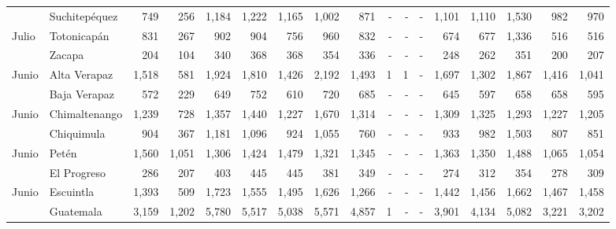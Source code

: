 \begin{landscape}
\begin{center}
\begin{longtable}{llrrrrrrrrrrrrrrr}
			\rowcolor{color1!5!white}\multicolumn{1}{l}{	\footnotesize	 Julio 	}&	 Suchitepéquez 	&	 749 	&	 256 	&	 1,184 	&	 1,222 	&	 1,165 	&	 1,002 	&	 871 	&	 -   	&	 -   	&	 -   	&	 1,101 	&	 1,110 	&	 1,530 	&	 982 	&	 970 	\\
			\multicolumn{1}{l}{	\footnotesize	 Julio 	}&	 Totonicapán 	&	 831 	&	 267 	&	 902 	&	 904 	&	 756 	&	 960 	&	 832 	&	 -   	&	 -   	&	 -   	&	 674 	&	 677 	&	 1,336 	&	 516 	&	 516 	\\
			\rowcolor{color1!5!white}\multicolumn{1}{l}{	\footnotesize	 Julio 	}&	 Zacapa 	&	 204 	&	 104 	&	 340 	&	 368 	&	 368 	&	 354 	&	 336 	&	 -   	&	 -   	&	 -   	&	 248 	&	 262 	&	 351 	&	 200 	&	 207 	\\
			\multicolumn{1}{l}{	\footnotesize	 Junio 	}&	 Alta Verapaz 	&	 1,518 	&	 581 	&	 1,924 	&	 1,810 	&	 1,426 	&	 2,192 	&	 1,493 	&	 1 	&	 1 	&	 -   	&	 1,697 	&	 1,302 	&	 1,867 	&	 1,416 	&	 1,041 	\\
			\rowcolor{color1!5!white}\multicolumn{1}{l}{	\footnotesize	 Junio 	}&	 Baja Verapaz 	&	 572 	&	 229 	&	 649 	&	 752 	&	 610 	&	 720 	&	 685 	&	 -   	&	 -   	&	 -   	&	 645 	&	 597 	&	 658 	&	 658 	&	 595 	\\
			\multicolumn{1}{l}{	\footnotesize	 Junio 	}&	 Chimaltenango 	&	 1,239 	&	 728 	&	 1,357 	&	 1,440 	&	 1,227 	&	 1,670 	&	 1,314 	&	 -   	&	 -   	&	 -   	&	 1,309 	&	 1,325 	&	 1,293 	&	 1,227 	&	 1,205 	\\
			\rowcolor{color1!5!white}\multicolumn{1}{l}{	\footnotesize	 Junio 	}&	 Chiquimula 	&	 904 	&	 367 	&	 1,181 	&	 1,096 	&	 924 	&	 1,055 	&	 760 	&	 -   	&	 -   	&	 -   	&	 933 	&	 982 	&	 1,503 	&	 807 	&	 851 	\\
			\multicolumn{1}{l}{	\footnotesize	 Junio 	}&	 Petén 	&	 1,560 	&	 1,051 	&	 1,306 	&	 1,424 	&	 1,479 	&	 1,321 	&	 1,345 	&	 -   	&	 -   	&	 -   	&	 1,363 	&	 1,350 	&	 1,488 	&	 1,065 	&	 1,054 	\\
			\rowcolor{color1!5!white}\multicolumn{1}{l}{	\footnotesize	 Junio 	}&	 El Progreso 	&	 286 	&	 207 	&	 403 	&	 445 	&	 445 	&	 381 	&	 349 	&	 -   	&	 -   	&	 -   	&	 274 	&	 312 	&	 354 	&	 278 	&	 309 	\\
			\multicolumn{1}{l}{	\footnotesize	 Junio 	}&	 Escuintla 	&	 1,393 	&	 509 	&	 1,723 	&	 1,555 	&	 1,495 	&	 1,626 	&	 1,266 	&	 -   	&	 -   	&	 -   	&	 1,442 	&	 1,456 	&	 1,662 	&	 1,467 	&	 1,458 	\\
			\rowcolor{color1!5!white}\multicolumn{1}{l}{	\footnotesize	 Junio 	}&	 Guatemala 	&	 3,159 	&	 1,202 	&	 5,780 	&	 5,517 	&	 5,038 	&	 5,571 	&	 4,857 	&	 1 	&	 -   	&	 -   	&	 3,901 	&	 4,134 	&	 5,082 	&	 3,221 	&	 3,202 	\\

\end{longtable}
\end{center}
\end{landscape}
